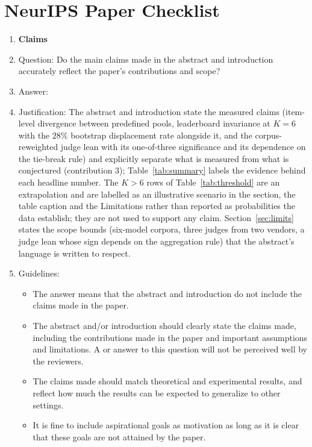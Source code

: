 \documentclass{article}
\begin{document}
\newpage
\section*{NeurIPS Paper Checklist}

\begin{enumerate}

\item {\bf Claims}
    \item[] Question: Do the main claims made in the abstract and introduction accurately reflect the paper's contributions and scope?
    \item[] Answer: \answerYes{}
    \item[] Justification: The abstract and introduction state the measured claims (item-level divergence between predefined pools, leaderboard invariance at $K=6$ with the $28\%$ bootstrap displacement rate alongside it, and the corpus-reweighted judge lean with its one-of-three significance and its dependence on the tie-break rule) and explicitly separate what is measured from what is conjectured (contribution 3); Table~\ref{tab:summary} labels the evidence behind each headline number. The $K>6$ rows of Table~\ref{tab:threshold} are an extrapolation and are labelled as an illustrative scenario in the section, the table caption and the Limitations rather than reported as probabilities the data establish; they are not used to support any claim. Section~\ref{sec:limits} states the scope bounds (six-model corpora, three judges from two vendors, a judge lean whose sign depends on the aggregation rule) that the abstract's language is written to respect.
    \item[] Guidelines:
    \begin{itemize}
        \item The answer \answerNA{} means that the abstract and introduction do not include the claims made in the paper.
        \item The abstract and/or introduction should clearly state the claims made, including the contributions made in the paper and important assumptions and limitations. A \answerNo{} or \answerNA{} answer to this question will not be perceived well by the reviewers.
        \item The claims made should match theoretical and experimental results, and reflect how much the results can be expected to generalize to other settings.
        \item It is fine to include aspirational goals as motivation as long as it is clear that these goals are not attained by the paper.
    \end{itemize}


\end{enumerate}
\end{document}
